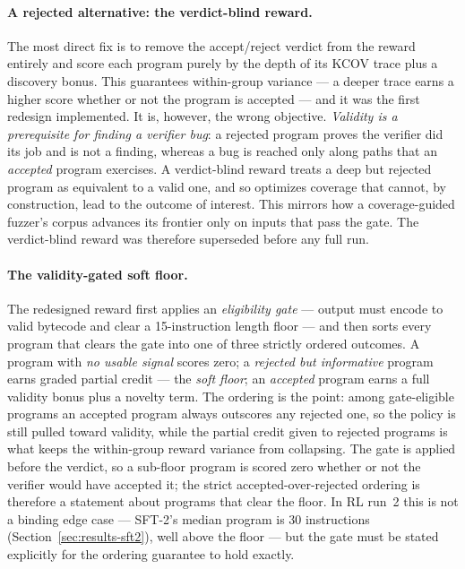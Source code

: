 \paragraph{A rejected alternative: the verdict-blind reward.}
The most direct fix is to remove the accept/reject verdict from the reward
entirely and score each program purely by the depth of its KCOV trace plus a
discovery bonus. This guarantees within-group variance --- a deeper trace earns a
higher score whether or not the program is accepted --- and it was the first
redesign implemented. It is, however, the wrong objective. \emph{Validity is a
prerequisite for finding a verifier bug}: a rejected program proves the verifier
did its job and is not a finding, whereas a bug is reached only along paths that
an \emph{accepted} program exercises. A verdict-blind reward treats a deep but
rejected program as equivalent to a valid one, and so optimizes coverage that
cannot, by construction, lead to the outcome of interest. This mirrors how a
coverage-guided fuzzer's corpus advances its frontier only on inputs that pass the
gate. The verdict-blind reward was therefore superseded before any full run.

\paragraph{The validity-gated soft floor.}
The redesigned reward first applies an \emph{eligibility gate} --- output must
encode to valid bytecode and clear a 15-instruction length floor --- and then
sorts every program that clears the gate into one of three strictly ordered
outcomes. A program with \emph{no usable signal} scores zero; a \emph{rejected but
informative} program earns graded partial credit --- the \emph{soft floor}; an
\emph{accepted} program earns a full validity bonus plus a novelty term. The
ordering is the point: among gate-eligible programs an accepted program always
outscores any rejected one, so the policy is still pulled toward validity, while
the partial credit given to rejected programs is what keeps the within-group
reward variance from collapsing. The gate is applied before the verdict, so a
sub-floor program is scored zero whether or not the verifier would have accepted
it; the strict accepted-over-rejected ordering is therefore a statement about
programs that clear the floor. In RL run~2 this is not a binding edge case ---
SFT-2's median program is 30 instructions (Section~\ref{sec:results-sft2}), well
above the floor --- but the gate must be stated explicitly for the ordering
guarantee to hold exactly.

